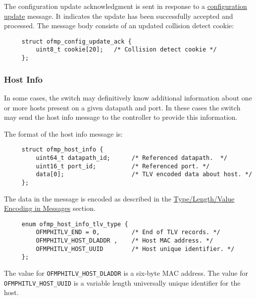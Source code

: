 \documentclass[11pt,a4paper]{article}
\begin{document}
     The configuration update acknowledgment is sent in response to a
     \hyperref[sec-2.8.4]{configuration update} message. It indicates the update has been
     successfully accepted and processed.  The message body consists
     of an updated collision detect cookie:

{ \footnotesize

\begin{verbatim}
     struct ofmp_config_update_ack {
         uint8_t cookie[20];   /* Collision detect cookie */
     };

\end{verbatim}


}

\subsubsection{Host Info}
\label{sec-2.8.6}


    In some cases, the switch may definitively know additional
    information about one or more hosts present on a given datapath
    and port.  In these cases the switch may send the host info
    message to the controller to provide this information.

    The format of the host info message is:

{ \footnotesize

\begin{verbatim}
     struct ofmp_host_info {
         uint64_t datapath_id;      /* Referenced datapath.  */
         uint16_t port_id;          /* Referenced port. */
         data[0];                   /* TLV encoded data about host. */
     };

\end{verbatim}


}

     The data in the message is encoded as described in the
     \hyperref[sec-2.4]{Type/Length/Value Encoding in Messages} section.

{ \footnotesize

\begin{verbatim}
     enum ofmp_host_info_tlv_type {
         OFMPHITLV_END = 0,         /* End of TLV records. */
         OFMPHITLV_HOST_DLADDR ,    /* Host MAC address. */
         OFMPHITLV_HOST_UUID        /* Host unique identifier. */
     };

\end{verbatim}


}

     The value for \verb|OFMPHITLV_HOST_DLADDR| is a six-byte MAC address.
     The value for \verb|OFMPHITLV_HOST_UUID| is a variable length
     universally unique identifier for the host.
\end{document}
